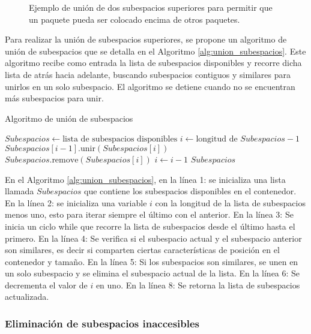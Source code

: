 \begin{figure}[H]
    \centering
    
    \caption{Ejemplo de unión de dos subespacios superiores para permitir que un paquete pueda ser colocado encima de otros paquetes.}
    \label{fig:union_subespacios}
\end{figure}

Para realizar la unión de subespacios superiores, se propone un algoritmo de unión de subespacios que se detalla en el Algoritmo \ref{alg:union_subespacios}. Este algoritmo recibe como entrada la lista de subespacios disponibles y recorre dicha lista de atrás hacia adelante, buscando subespacios contiguos y similares para unirlos en un solo subespacio. El algoritmo se detiene cuando no se encuentran más subespacios para unir.

\begin{algorithm}[H]
    \caption{Algoritmo de unión de subespacios}
    \label{alg:union_subespacios}
    \begin{algorithmic}[1]
        \State $Subespacios \gets \text{lista de subespacios disponibles}$
        \State $i \gets \text{longitud de } Subespacios - 1$
        \State $Subespacios[i-1].\text{unir}(Subespacios[i])$
        \State $Subespacios.\text{remove}(Subespacios[i])$
        \EndIf
        \State $i \gets i - 1$
        \EndWhile
        \State \Return $Subespacios$
    \end{algorithmic}
\end{algorithm}

En el Algoritmo \ref{alg:union_subespacios}, en la línea 1: se inicializa una lista llamada $Subespacios$ que contiene los subespacios disponibles en el contenedor. En la línea 2: se inicializa una variable $i$ con la longitud de la lista de subespacios menos uno, esto para iterar siempre el último con el anterior. En la línea 3: Se inicia un ciclo while que recorre la lista de subespacios desde el último hasta el primero. En la línea 4: Se verifica si el subespacio actual y el subespacio anterior son similares, es decir si comparten ciertas características de posición en el contenedor y tamaño. En la línea 5: Si los subespacios son similares, se unen en un solo subespacio y se elimina el subespacio actual de la lista. En la línea 6: Se decrementa el valor de $i$ en uno. En la línea 8: Se retorna la lista de subespacios actualizada.

\subsubsection{Eliminación de subespacios inaccesibles}

